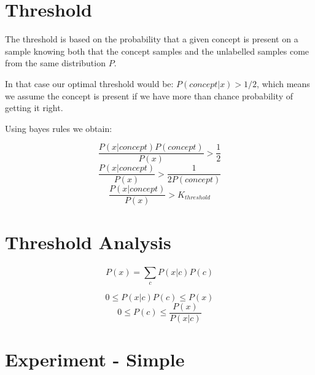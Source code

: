 \documentclass[a4paper]{article}
\begin{document}
\section{Threshold}
\label{sec:threshold}

The threshold is based on the probability that a given concept is present on a sample
knowing both that the concept samples and the unlabelled samples come from the same distribution $P$.

In that case our optimal threshold would be:
$P(concept | x) > 1/2$, which means we assume the concept is present if we have more than chance probability of getting it right.

Using bayes rules we obtain:

\begin{equation}\frac{P(x|concept) P(concept)}{P(x)} > \frac{1}{2}\end{equation}
\begin{equation}\frac{P(x|concept)}{P(x)} > \frac{1}{2 P(concept)}\end{equation}
\begin{equation}\frac{P(x|concept)}{P(x)} > K_{threshold}\end{equation}


\section{Threshold Analysis}
\label{sec:threshold-analysis}

\begin{equation}P(x) = \sum_{c}^{} P(x|c) P(c)\end{equation}

\begin{equation}0 \le P(x|c) P(c) \le P(x)\end{equation}
\begin{equation}0 \le P(c) \le \frac{P(x)}{P(x|c)}\end{equation}

\section{Experiment - Simple}

\end{document}
